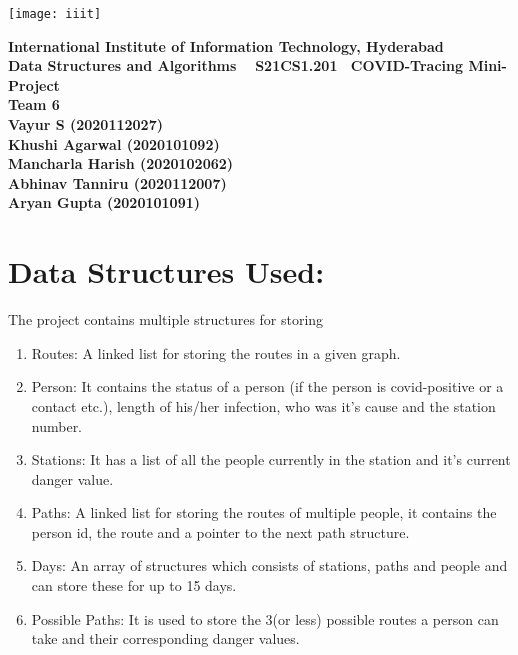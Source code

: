 \documentclass{article}
\begin{document}
\begin{titlepage}

\centering
\vfill
\texttt{[image: iiit]}
\vskip1cm

{\bfseries\Large
		International Institute of Information Technology, Hyderabad\\
        \vskip1cm
        Data Structures and Algorithms \
        \vskip1cm
        S21CS1.201\
        \vskip2cm
        COVID-Tracing Mini-Project\\
        \vskip2cm
       Team 6}\\
        \vskip 1cm
{\bfseries        
        Vayur S (2020112027)\\
        \vskip 0.5cm
        Khushi Agarwal (2020101092)\\
        \vskip 0.5cm
        Mancharla Harish (2020102062)\\
        \vskip 0.5cm
        Abhinav Tanniru (2020112007)\\
        \vskip 0.5cm
        Aryan Gupta (2020101091)}
    


\end{titlepage}
\newpage

\section{Data Structures Used:}
The project contains multiple structures for storing
\begin{enumerate}
    \item Routes: A linked list for storing the routes in a given graph. 
    \item Person: It contains the status of a person (if the person is covid-positive or a contact etc.), length of his/her infection, who was it's cause and the station number.
    \item Stations: It has a list of all the people currently in the station and it's current danger value.
    \item Paths: A linked list for storing the routes of multiple people, it contains the person id, the route and a pointer to the next path structure.
    \item Days: An array of structures which consists of stations, paths and people and can store these for up to 15 days.
    \item Possible Paths: It is used to store the 3(or less) possible routes a person can take and their corresponding danger values.
\end{enumerate}
\end{document}
